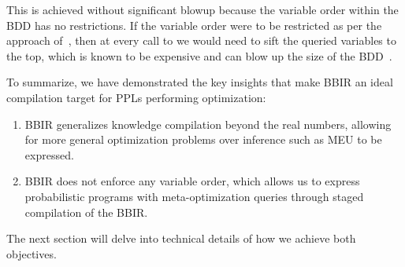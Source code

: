 This is achieved without significant blowup because the variable order within the BDD
has no restrictions.
If the variable order were to be restricted
as per the approach of~\citet{derkinderen2020algebraic},
then at every call to 
we would need to sift the queried variables to the top,
which is known to be expensive and can blow up
the size of the BDD~\citep{holtzen2020scaling,holtzen2021model}.

To summarize, we have demonstrated the key insights that make BBIR an ideal
compilation target for PPLs performing optimization:
\begin{enumerate}
  \item BBIR generalizes knowledge compilation beyond the real numbers,
  allowing for more general
  optimization problems over inference such as MEU to be expressed.
  \item BBIR does not enforce any variable order, which allows us to
  express probabilistic programs with meta-optimization queries
  through staged compilation of the BBIR.
\end{enumerate}
The next section will delve into technical details of how we achieve both objectives.
%





